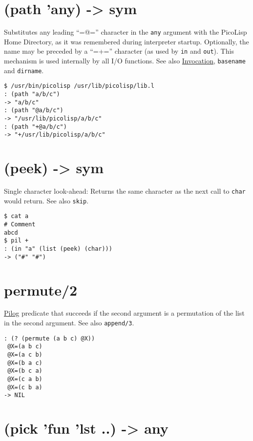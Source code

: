 {{{{{{{ 
\section{(path 'any) -> sym}
\label{sec-8-1-16-11}


Substitutes any leading ``=@='' character in the \texttt{any} argument with the
PicoLisp Home Directory, as it was remembered during interpreter
startup. Optionally, the name may be preceded by a ``=+='' character (as
used by \texttt{in} and \texttt{out}). This mechanism is used internally by all I/O
functions. See also \hyperref[ref.html-invoc]{Invocation}, \texttt{basename} and
\texttt{dirname}.


\begin{verbatim}
$ /usr/bin/picolisp /usr/lib/picolisp/lib.l
: (path "a/b/c")
-> "a/b/c"
: (path "@a/b/c")
-> "/usr/lib/picolisp/a/b/c"
: (path "+@a/b/c")
-> "+/usr/lib/picolisp/a/b/c"
\end{verbatim}

 
\section{(peek) -> sym}
\label{sec-8-1-16-12}


Single character look-ahead: Returns the same character as the next call
to \texttt{char} would return. See also \texttt{skip}.


\begin{verbatim}
$ cat a
# Comment
abcd
$ pil +
: (in "a" (list (peek) (char)))
-> ("#" "#")
\end{verbatim}

 
\section{permute/2}
\label{sec-8-1-16-13}


\hyperref[ref.html-pilog]{Pilog} predicate that succeeds if the second argument
is a permutation of the list in the second argument. See also
\texttt{append/3}.


\begin{verbatim}
: (? (permute (a b c) @X))
 @X=(a b c)
 @X=(a c b)
 @X=(b a c)
 @X=(b c a)
 @X=(c a b)
 @X=(c b a)
-> NIL
\end{verbatim}

 
\section{(pick 'fun 'lst ..) -> any}
\label{sec-8-1-16-14}


}}}}}}}
